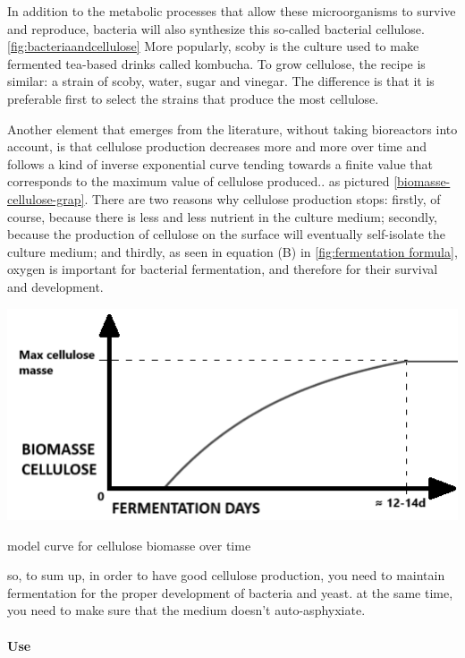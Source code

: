 In addition to the metabolic processes that allow these microorganisms to survive and reproduce, bacteria will also synthesize this so-called bacterial cellulose.\ref{fig:bacteriaandcellulose} 
More popularly, scoby is the culture used to make fermented tea-based drinks called kombucha. 
To grow cellulose, the recipe is similar: a strain of scoby, water, sugar and vinegar. The difference is that it is preferable first to select the strains that produce the most cellulose. 

Another element that emerges from the literature, without taking bioreactors into account, is that cellulose production decreases more and more over time and follows a kind of inverse exponential curve tending towards a finite value that corresponds to the maximum value of cellulose produced.\cite{chong2024modelling}.
as pictured \ref{biomasse-cellulose-grap}. There are two reasons why cellulose production stops: firstly, of course, because there is less and less nutrient in the culture medium; secondly, because the production of cellulose on the surface will eventually self-isolate the culture medium; and thirdly, as seen in equation (B) in \ref{fig:fermentation formula}, oxygen is important for bacterial fermentation, and therefore for their survival and development. 
\begin{marginfigure}
    \centering
    \includegraphics{images/biomasse-cellulose.png}
    \caption{model curve for cellulose biomasse over time}
    \label{fig:biomasse-cellulose-graph}
\end{marginfigure}

so, to sum up, in order to have good cellulose production, you need to maintain fermentation for the proper development of bacteria and yeast. at the same time, you need to make sure that the medium doesn't auto-asphyxiate.



\paragraph[short]{Use}

